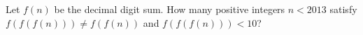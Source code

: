 Let $ f(n)$ be the decimal digit sum. How many positive integers $ n<2013 $ satisfy $ f(f(f(n)))\ne f(f(n))$ and $ f(f(f(n)))<10 $?

